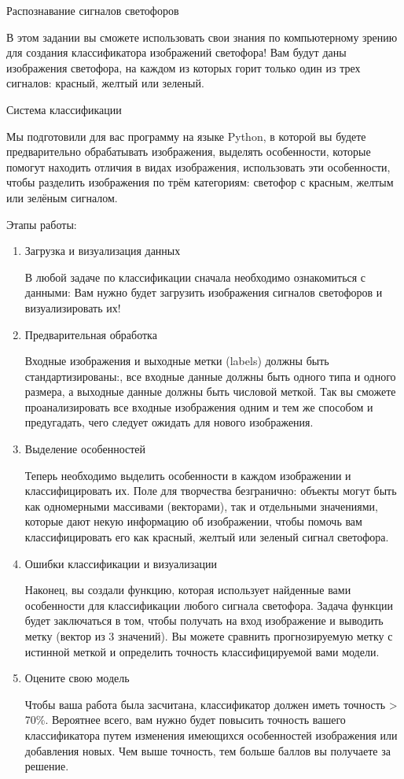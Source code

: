 \assignementTitle{}{}{}

Распознавание сигналов светофоров

В этом задании вы сможете использовать свои знания по компьютерному зрению для создания классификатора изображений светофора! Вам будут даны изображения светофора, на каждом из которых горит только один из трех сигналов: красный, желтый или зеленый.

Система классификации

Мы подготовили для вас программу на языке Python, в которой вы будете предварительно обрабатывать изображения, выделять особенности, которые помогут находить отличия в видах изображения, использовать эти особенности, чтобы разделить изображения по трём категориям: светофор с красным, желтым или зелёным сигналом.

Этапы работы:

\begin{enumerate}
    \item Загрузка и визуализация данных

    В любой задаче по классификации сначала необходимо ознакомиться с данными: Вам нужно будет загрузить изображения сигналов светофоров и визуализировать их!

    \item Предварительная обработка

    Входные изображения и выходные метки (labels) должны быть стандартизированы:, все входные данные должны быть одного типа и одного размера, а выходные данные должны быть числовой меткой. Так вы сможете проанализировать все входные изображения одним и тем же способом и предугадать, чего следует ожидать для нового изображения.

    \item Выделение особенностей

    Теперь необходимо выделить особенности в каждом изображении и классифицировать их. Поле для творчества безгранично: объекты могут быть как одномерными массивами (векторами), так и отдельными значениями, которые дают некую информацию об изображении, чтобы помочь вам классифицировать его как красный, желтый или зеленый сигнал светофора. 


    \item Ошибки классификации и визуализации

    Наконец, вы создали функцию, которая использует найденные вами особенности для классификации любого сигнала светофора. Задача функции будет заключаться в том, чтобы получать на вход изображение и выводить метку (вектор из 3 значений). Вы можете сравнить прогнозируемую метку с истинной меткой и определить точность классифицируемой вами модели.

    \item Оцените свою модель

    Чтобы ваша работа была засчитана, классификатор должен иметь точность > 70\%. Вероятнее всего, вам нужно будет повысить точность вашего классификатора путем изменения имеющихся особенностей изображения или добавления новых. Чем выше точность, тем больше баллов вы получаете за решение.
\end{enumerate}

